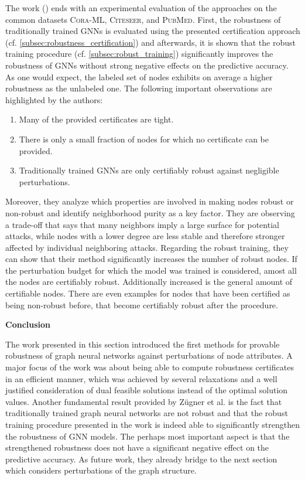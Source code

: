 \documentclass[a4paper,preprint]{sig-alternate}
\begin{document}
The work (\cite{Zuegner_2019}) ends with an experimental evaluation of the approaches on the common datasets \textsc{Cora-ML}, 
\textsc{Citeseer}, and \textsc{PubMed}. First, the robustness of traditionally trained GNNs is evaluated using the presented
certification approach (cf. \ref{subsec:robustness_certification}) and afterwards, it is shown that the robust training procedure
(cf. \ref{subsec:robust_training}) significantly improves the robustness of GNNs without strong negative effects on the predictive accuracy.
As one would expect, the labeled set of nodes exhibits on average a higher robustness as the unlabeled one.
The following important observations are highlighted by the authors:
\begin{enumerate}
    \item Many of the provided certificates are tight.
    \item There is only a small fraction of nodes for which no certificate can be provided.
    \item Traditionally trained GNNs are only certifiably robust against negligible perturbations.
\end{enumerate}
Moreover, they analyze which properties are involved in making nodes robust or non-robust and identify neighborhood purity
as a key factor. 
They are observing a trade-off that says that many neighbors imply a large surface for potential attacks, while nodes 
with a lower degree are less stable and therefore stronger affected by individual neighboring attacks.
Regarding the robust training, they can show that their method significantly increases the number of robust nodes. 
If the perturbation budget for which the model was trained is considered, amost all the nodes are certifiably robust. \cite{Zuegner_2019}
Additionally increased is the general amount of certifiable nodes. There are even examples for nodes that have been certified as being
non-robust before, that become certifiably robust after the procedure.\newline

\textbf{Conclusion}\newline

The work presented in this section introduced the first methods for provable robustness of graph neural networks against
perturbations of node attributes. A major focus of the work was about being able to compute robustness certificates in an efficient
manner, which was achieved by several relaxations and a well justified consideration of dual feasible solutions instead of the optimal
solution values. Another fundamental result provided by Zügner et al. \cite{Zuegner_2019} is the fact that traditionally trained graph neural
networks are not robust and that the robust training procedure presented in the work is indeed able to significantly strengthen the robustness
of GNN models. The perhaps most important aspect is that the strengthened robustness does not have a significant negative effect on the predictive accuracy.
As future work, they already bridge to the next section which considers perturbations of the graph structure.
\end{document}
